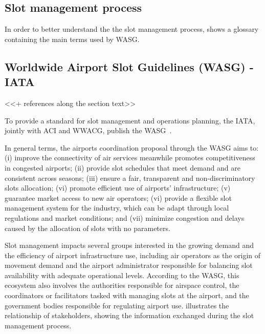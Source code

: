 \subsection{Slot management process} 



In order to better understand the the slot management process, 
shows a glossary containing the main terms used by \acrshort{WASG}.






\subsection{Worldwide Airport Slot Guidelines (\acrshort{WASG}) - \acrshort{IATA}}
\label{subsec:WorAirSloGui}

<<+ references along the section text>> 

To provide a standard for slot management and operations planning, the
\acrshort{IATA}, jointly with \acrfull{ACI} and \acrfull{WWACG}, publish the
\acrshort{WASG}~\cite{WASG2020}.

In general terms, the airports coordination proposal through the
\acrshort{WASG} aims to: (i) improve the connectivity of air services meanwhile
promotes competitiveness in congested airports; (ii) provide slot schedules
that meet demand and are consistent across seasons; (iii) ensure a fair,
transparent and non-discriminatory slots allocation; (vi) promote efficient use
of airports’ infrastructure; (v) guarantee market access to new air operators;
(vi) provide a flexible slot management system for the industry, which can be
adapt through local regulations and market conditions; and (vii) minimize
congestion and delays caused by the allocation of slots with no parameters.




Slot management impacts several groups interested in the growing demand and the
efficiency of airport infrastructure use, including air operators as the origin
of movement demand and the airport administrator responsible for balancing slot
availability with adequate operational levels.
%
According to the \acrshort{WASG}, this ecosystem also involves the authorities
responsible for airspace control, the coordinators or facilitators tasked with
managing slots at the airport, and the government bodies responsible for
regulating airport use.
%
 illustrates the relationship of stakeholders,
showing the information exchanged during the slot management process.



